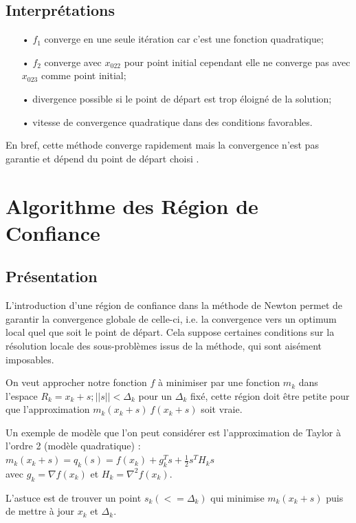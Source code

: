 \documentclass[a4paper,12pt]{article}
\theoremstyle{break}
\begin{document}
\subsection{Interprétations}
\begin{itemize}
\item[•] $f_1$ converge en une seule itération car c'est une fonction quadratique;
\item[•] $f_2$ converge avec $x_022$ pour point initial cependant elle ne converge pas avec $x_023$ comme point initial;
\item[•] divergence possible si le point de départ est trop éloigné de la solution;
\item[•] vitesse de convergence quadratique dans des conditions favorables.
\end{itemize}

En bref, cette méthode converge rapidement mais la convergence n'est pas garantie et dépend du point de départ choisi .

\newpage

\section{Algorithme des Région de Confiance}
\subsection{Présentation}

L'introduction d'une région de confiance dans la méthode de Newton permet de garantir
la convergence globale de celle-ci, i.e. la convergence vers un optimum local quel que soit
le point de départ. Cela suppose certaines conditions sur la résolution locale des sous-problèmes issus de la méthode, qui sont aisément imposables.

On veut approcher notre fonction $f$ à minimiser par une fonction $m_k$ dans l'espace $R_k = {x_k+s; ||s||<\Delta_k}$ pour un $\Delta_k$ fixé, cette région doit être petite pour que l'approximation $m_k(x_k+s)~f(x_k+s)$ soit vraie.

Un exemple de modèle que l'on peut considérer est l'approximation de Taylor à l'ordre 2 (modèle quadratique) : \\
$m_k(x_k+s) = q_k(s) = f(x_k) + g_k^Ts + \frac{1}{2} s^TH_ks$\\
avec $g_k = \nabla f(x_k)$ et $H_k = \nabla^2 f(x_k)$.

L'astuce est de trouver un point $s_k (<=\Delta_k)$ qui minimise $m_k(x_k+s)$ puis de mettre à jour $x_k$ et $\Delta_k$.
\end{document}
